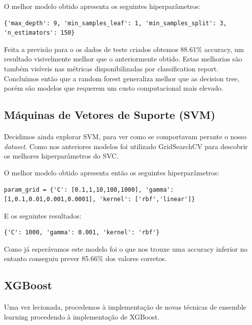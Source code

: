 O melhor modelo obtido apresenta os seguintes hiperparâmetros:
\begin{verbatim}
{'max_depth': 9, 'min_samples_leaf': 1, 'min_samples_split': 3, 'n_estimators': 150}
\end{verbatim}

Feita a previsão para o os dados de teste criados obtemos 88.61\% accuracy, um resultado visivelmente melhor que o anteriormente obtido.
Estas melhorias são também visíveis nas métricas disponibilizadas por classification report.
Concluímos então que a random forest generaliza melhor que as decision tree, porém são modelos que requerem um custo computacional mais elevado.

\subsection{Máquinas de Vetores de Suporte (SVM)}
\paragraph{}
Decidimos ainda explorar SVM, para ver como se comportavam perante o nosso \textit{dataset}.
Como nos anteriores modelos foi utilizado GridSearchCV para descobrir os melhores hiperparâmetros do SVC.

O melhor modelo obtido apresenta então os seguintes hiperparâmetros:
\begin{verbatim}
param_grid = {'C': [0.1,1,10,100,1000], 'gamma': [1,0.1,0.01,0.001,0.0001], 'kernel': ['rbf','linear']}
\end{verbatim}

E os seguintes resultados:
\begin{verbatim}
{'C': 1000, 'gamma': 0.001, 'kernel': 'rbf'}
\end{verbatim}

Como já esperávamos este modelo foi o que nos trouxe uma accuracy inferior no entanto conseguiu prever 85.66\% dos valores corretos.

\subsection{XGBoost}
\paragraph{}
Uma vez lecionada, procedemos à implementação de novas técnicas de ensemble learning procedendo à implementação de XGBoost.

